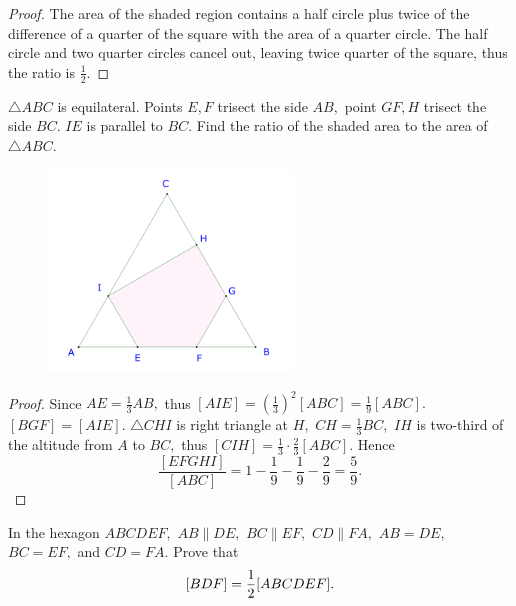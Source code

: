 \documentclass{article}
\begin{document}
\begin{proof}
    The area of the shaded region contains a half circle plus twice of the difference of a quarter of the square with the area of a quarter circle.
    The half circle and two quarter circles cancel out, leaving twice quarter of the square, thus the ratio is $\frac{1}{2}.$ 
\end{proof}

\newpage

\begin{example*}[Example 9]
    \label{example:23-24-s3-i-p9}
    $\triangle ABC$ is equilateral. Points $E, F$ trisect the side $AB,$ point $GF, H$ trisect the side $BC.$ $IE$ is parallel to $BC.$
    Find the ratio of the shaded area to the area of $\triangle ABC.$
\end{example*}

\begin{figure}[h]
    \centering
    \begin{minipage}[t]{6.5cm}
        \begin{center}
            \includegraphics[width=6.5cm]{./svg/pdf/23-24-s3-i-p9.pdf}
        \end{center}
    \end{minipage}
\end{figure}

\begin{proof}
    Since $AE = \frac{1}{3}AB,$ thus $[AIE] = \left(\frac{1}{3}\right)^2[ABC] = \frac{1}{9}[ABC].$  $[BGF] = [AIE].$ 
    $\triangle CHI$ is right triangle at $H,$ $CH = \frac{1}{3} BC,$ $IH$ is two-third of the altitude from $A$ to $BC,$ thus
    $[CIH] = \frac{1}{3}\cdot\frac{2}{3} [ABC].$
    Hence
    \[
        \frac{[EFGHI]}{[ABC]} = 1- \frac{1}{9} - \frac{1}{9} - \frac{2}{9} = \frac{5}{9}.
    \]
\end{proof}

\begin{example*}[Example 10]
    In the hexagon $ABCDEF,$ $AB \parallel DE,$ $BC \parallel EF,$ $CD \parallel FA,$ $AB = DE,$ $BC = EF,$ and $CD = FA.$
    Prove that
    \[
        [BDF] = \frac{1}{2} [ABCDEF].
    \]
\end{example*}
\end{document}
